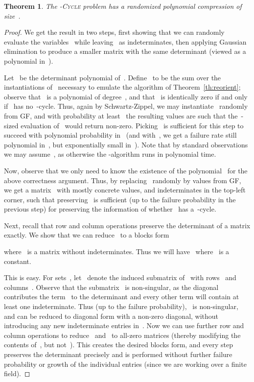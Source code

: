 \documentclass[a4paper,11pt]{article}
\newtheorem{theorem}{Theorem}
\begin{document}
\begin{theorem}
The \textsc{-Cycle} problem has a randomized polynomial compression of size~.
\end{theorem}
\begin{proof}
We get the result in two steps, first showing that we can randomly evaluate the
variables~ while leaving~ as indeterminates,
then applying Gaussian elimination to produce a smaller matrix with the same determinant
(viewed as a polynomial in~). 

Let~ be the determinant polynomial of~.
Define~ to be the sum over the~ instantiations of~
necessary to emulate the algorithm of Theorem~\ref{th:reorient};
observe that~ is a polynomial of degree~, and that~ is
identically zero if and only if~ has no~-cycle. Thus, again by Schwartz-Zippel,
we may instantiate~ randomly from GF, and with probability at
least~ the resulting values are such that the~-sized evaluation
of~ would return non-zero. Picking~ is sufficient for
this step to succeed with polynomial probability in~ (and with~, 
we get a failure rate still polynomial in~, but exponentially small in~). 
Note that by standard observations we may assume~, as otherwise the
-algorithm runs in polynomial time. 

Now, observe that we only need to know the existence of the polynomial~ for the above
correctness argument. Thus, by replacing~ randomly by values from
GF, we get a matrix~ with mostly concrete values, and indeterminates in
the top-left~ corner, such that preserving~ is sufficient (up to
the failure probability in the previous step) for preserving the information of
whether~ has a~-cycle.

Next, recall that row and column operations preserve the determinant of a matrix exactly. 
We show that we can reduce~ to a blocks form

where~ is a matrix without indeterminates. Thus we will have~ 
where~ is a constant. 

This is easy. For sets~, let~ denote the induced submatrix
of~ with rows~ and columns~. 
Observe that the submatrix~ is non-singular, as the diagonal
contributes the term~ to the determinant and every other term will contain at least one
indeterminate. Thus (up to the failure probability),~ is
non-singular, and can be reduced to diagonal form with a non-zero diagonal, without
introducing any new indeterminate entries in~. Now we can use further row and column
operations to reduce~ and~ to all-zero matrices
(thereby modifying the contents of~, but not~).
This creates the desired blocks form, and every step preserves the determinant precisely
and is performed without further failure probability or growth of the individual entries
(since we are working over a finite field). 


\end{proof}
\end{document}
